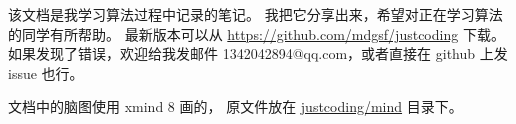 该文档是我学习算法过程中记录的笔记。
我把它分享出来，希望对正在学习算法的同学有所帮助。
最新版本可以从 \href{https://github.com/mdgsf/justcoding}{https://github.com/mdgsf/justcoding} 下载。
如果发现了错误，欢迎给我发邮件 1342042894@qq.com，或者直接在 github 上发 issue 也行。

文档中的脑图使用 xmind 8 画的，
原文件放在 \href{https://github.com/MDGSF/JustCoding/tree/master/mind}{justcoding/mind} 目录下。
